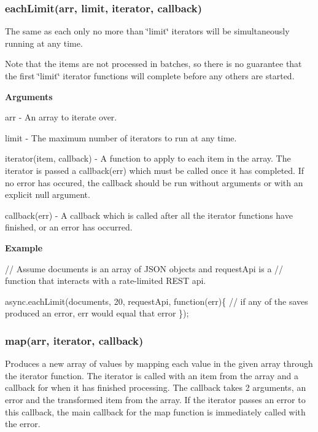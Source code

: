\label{_forEachLimit}%
 \label{_eachLimit}%
 \subsubsection*{each\+Limit(arr, limit, iterator, callback)}

The same as each only no more than \char`\"{}limit\char`\"{} iterators will be simultaneously running at any time.

Note that the items are not processed in batches, so there is no guarantee that the first \char`\"{}limit\char`\"{} iterator functions will complete before any others are started.

{\bfseries Arguments}


\begin{DoxyItemize}
\item arr -\/ An array to iterate over.
\item limit -\/ The maximum number of iterators to run at any time.
\item iterator(item, callback) -\/ A function to apply to each item in the array. The iterator is passed a callback(err) which must be called once it has completed. If no error has occured, the callback should be run without arguments or with an explicit null argument.
\item callback(err) -\/ A callback which is called after all the iterator functions have finished, or an error has occurred.
\end{DoxyItemize}

{\bfseries Example}


\begin{DoxyCode}
// Assume documents is an array of JSON objects and requestApi is a
// function that interacts with a rate-limited REST api.

async.eachLimit(documents, 20, requestApi, function(err)\{
    // if any of the saves produced an error, err would equal that error
\});
\end{DoxyCode}
 



\label{_map}%
 \subsubsection*{map(arr, iterator, callback)}

Produces a new array of values by mapping each value in the given array through the iterator function. The iterator is called with an item from the array and a callback for when it has finished processing. The callback takes 2 arguments, an error and the transformed item from the array. If the iterator passes an error to this callback, the main callback for the map function is immediately called with the error.

